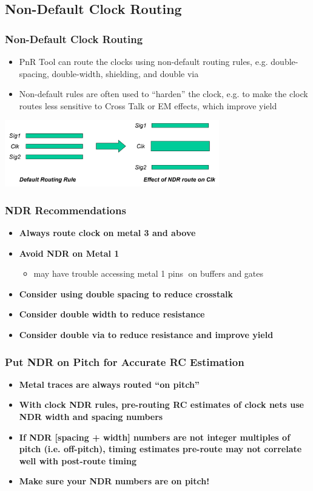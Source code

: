 \documentclass[compress]{beamer}
\begin{document}
\subsection[NDR]{Non-Default Clock Routing}
\begin{frame}
	\frametitle{Non-Default Clock Routing}
	\begin{itemize}
		\item PnR Tool can route the clocks using non-default routing rules, e.g. double-spacing, double-width, shielding, and double via
		\item Non-default rules are often used to “harden” the clock, e.g. to make the clock routes less sensitive to Cross Talk or EM effects, which improve yield
	\end{itemize}
	\begin{center}
		\includegraphics[width=0.7\textwidth]{NDR}
	\end{center}
\end{frame}

\begin{frame}
	\frametitle{NDR Recommendations}
	\begin{itemize}
		\item \textbf{Always route clock on metal 3 and above}
		\item \textbf{Avoid NDR on Metal 1}
		\begin{itemize}
			\item may have trouble accessing metal 1 pins on buffers and gates
		\end{itemize}
		\item \textbf{Consider using double spacing to reduce crosstalk}
		\item \textbf{Consider double width to reduce resistance}
		\item \textbf{Consider double via to reduce resistance and improve yield}
	\end{itemize}
\end{frame}

\begin{frame}
	\frametitle{Put NDR on Pitch for Accurate RC Estimation}
	\begin{itemize}
		\item \textbf{Metal traces are always routed “on pitch”}
		\item \textbf{With clock NDR rules, pre-routing RC estimates of
		clock nets use NDR width and spacing numbers}
		\item \textbf{If NDR [spacing + width] numbers are not integer
		multiples of pitch (i.e. off-pitch), timing estimates pre-route may not correlate well with post-route timing}
		\item \textbf{Make sure your NDR numbers are on pitch!}
	\end{itemize}
\end{frame}
\end{document}
